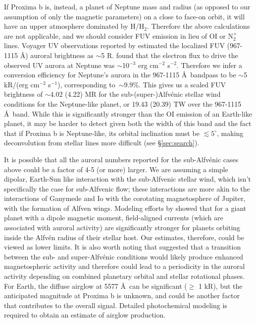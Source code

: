 \documentclass[apjl]{emulateapj}
\begin{document}
If Proxima b is, instead, a planet of Neptune mass and radius (as opposed to our assumption of only the magnetic parameters) on a close to face-on orbit, it will have an upper atmosphere dominated by H/H$_2$. Therefore the above calculations are not applicable, and we should consider FUV emission in lieu of OI or N$_2^+$ lines. Voyager UV observations reported by \citet{Sandel1990} estimated the localized FUV (967-1115 \AA) auroral brightness as $\sim$5 R. \citet{Mauk1994} found that the electron flux to drive the observed UV aurora at Neptune was $\sim$10$^{-3}$ erg cm$^{-2}$ s$^{-2}$. Therefore we infer a conversion efficiency for Neptune's aurora in the 967-1115 \AA\ bandpass to be $\sim$5 kR/(erg cm$^{-2}$ s$^{-1}$), corresponding to~$\sim$9.9\%. This gives us a scaled FUV brightness of $\sim$4.02 (4.22) MR for the sub-(super-)Alfv\'{e}nic stellar wind conditions for the Neptune-like planet, or 19.43 (20.39) TW over the 967-1115 \AA\ band. While this is significantly stronger than the OI emission of an Earth-like planet, it may be harder to detect given both the width of this band and the fact that if Proxima b is Neptune-like, its orbital inclination must be $\lesssim 5^\circ$, making deconvolution from stellar lines more difficult (see \S\ref{sec:search}).

It is possible that all the auroral numbers reported for the sub-Alfv\'{e}nic cases above could be a factor of 4-5 (or more) larger. We are assuming a simple dipolar, Earth-Sun like interaction with the sub-Alfvenic stellar wind, which isn't specifically the case for sub-Alfvenic flow; these interactions are more akin to the interactions of Ganymede and Io with the corotating magnetosphere of Jupiter, with the formation of Alfven wings. Modeling efforts by \citet{Preusse2007} showed that for a giant planet with a dipole magnetic moment, field-aligned currents (which are associated with auroral activity) are significantly stronger for planets orbiting inside the Alfv\'{e}n radius of their stellar host. Our estimates, therefore, could be viewed as lower limits. It is also worth noting that \citet{Cohen2014} suggested that a transition between the sub- and super-Alfv\'{e}nic conditions would likely produce enhanced magnetospheric activity and therefore could lead to a periodicity in the auroral activity depending on combined planetary orbital and stellar rotational phases. For Earth, the diffuse airglow at 5577 \AA\ can be significant ($\geq$ 1 kR), but the anticipated magnitude at Proxima b is unknown, and could be another factor that contributes to the overall signal. Detailed photochemical modeling is required to obtain an estimate of airglow production.
\end{document}
